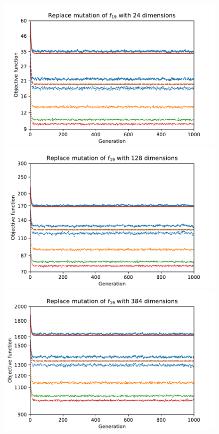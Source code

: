 \begin{figure}[ht!]
    \begin{minipage}[t]{0.32\textwidth}
        \centering
        \includegraphics[width=\textwidth]{img/runs/fitness_es_mutation_f19_dim24_ReplaceUniform.pdf}
    \end{minipage}
    \hfill
    \begin{minipage}[t]{0.32\textwidth}
        \centering
        \includegraphics[width=\textwidth]{img/runs/fitness_es_mutation_f19_dim128_ReplaceUniform.pdf}
    \end{minipage}
    \hfill
    \begin{minipage}[t]{0.32\textwidth}
        \centering
        \includegraphics[width=\textwidth]{img/runs/fitness_es_mutation_f19_dim384_ReplaceUniform.pdf}

\end{minipage}
\end{figure}
